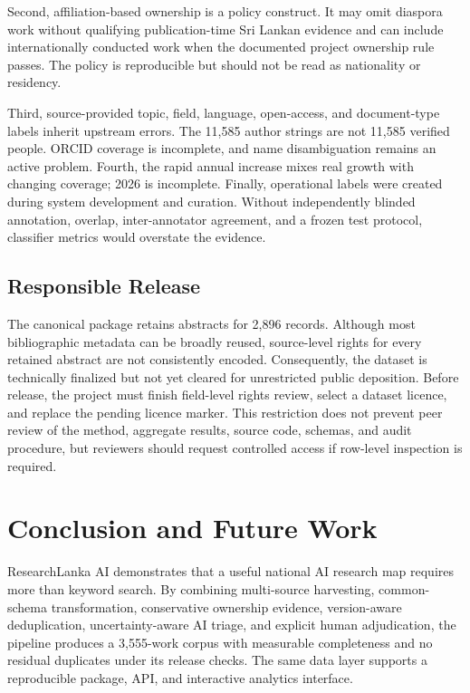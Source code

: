 \documentclass[conference]{IEEEtran}
\begin{document}
Second, affiliation-based ownership is a policy construct. It may omit diaspora work without qualifying publication-time Sri Lankan evidence and can include internationally conducted work when the documented project ownership rule passes. The policy is reproducible but should not be read as nationality or residency.

Third, source-provided topic, field, language, open-access, and document-type labels inherit upstream errors. The 11,585 author strings are not 11,585 verified people. ORCID coverage is incomplete, and name disambiguation remains an active problem. Fourth, the rapid annual increase mixes real growth with changing coverage; 2026 is incomplete. Finally, operational labels were created during system development and curation. Without independently blinded annotation, overlap, inter-annotator agreement, and a frozen test protocol, classifier metrics would overstate the evidence.

\subsection{Responsible Release}
The canonical package retains abstracts for 2,896 records. Although most bibliographic metadata can be broadly reused, source-level rights for every retained abstract are not consistently encoded. Consequently, the dataset is technically finalized but not yet cleared for unrestricted public deposition. Before release, the project must finish field-level rights review, select a dataset licence, and replace the pending licence marker. This restriction does not prevent peer review of the method, aggregate results, source code, schemas, and audit procedure, but reviewers should request controlled access if row-level inspection is required.

\balance
\section{Conclusion and Future Work}
ResearchLanka AI demonstrates that a useful national AI research map requires more than keyword search. By combining multi-source harvesting, common-schema transformation, conservative ownership evidence, version-aware deduplication, uncertainty-aware AI triage, and explicit human adjudication, the pipeline produces a 3,555-work corpus with measurable completeness and no residual duplicates under its release checks. The same data layer supports a reproducible package, API, and interactive analytics interface.
\end{document}
